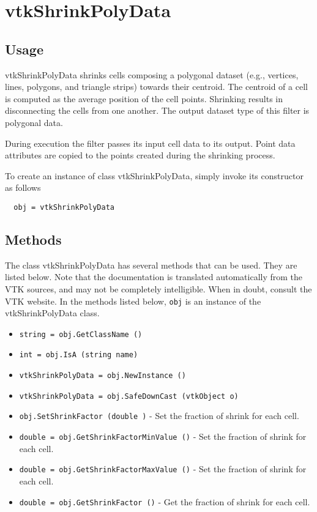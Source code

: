 \section{vtkShrinkPolyData}

\subsection{Usage}

 vtkShrinkPolyData shrinks cells composing a polygonal dataset (e.g., 
 vertices, lines, polygons, and triangle strips) towards their centroid. 
 The centroid of a cell is computed as the average position of the
 cell points. Shrinking results in disconnecting the cells from
 one another. The output dataset type of this filter is polygonal data.

 During execution the filter passes its input cell data to its
 output. Point data attributes are copied to the points created during the
 shrinking process.

To create an instance of class vtkShrinkPolyData, simply
invoke its constructor as follows
\begin{verbatim}
  obj = vtkShrinkPolyData
\end{verbatim}
\subsection{Methods}

The class vtkShrinkPolyData has several methods that can be used.
  They are listed below.
Note that the documentation is translated automatically from the VTK sources,
and may not be completely intelligible.  When in doubt, consult the VTK website.
In the methods listed below, \verb|obj| is an instance of the vtkShrinkPolyData class.
\begin{itemize}
\item  \verb|string = obj.GetClassName ()|

\item  \verb|int = obj.IsA (string name)|

\item  \verb|vtkShrinkPolyData = obj.NewInstance ()|

\item  \verb|vtkShrinkPolyData = obj.SafeDownCast (vtkObject o)|

\item  \verb|obj.SetShrinkFactor (double )| -  Set the fraction of shrink for each cell.

\item  \verb|double = obj.GetShrinkFactorMinValue ()| -  Set the fraction of shrink for each cell.

\item  \verb|double = obj.GetShrinkFactorMaxValue ()| -  Set the fraction of shrink for each cell.

\item  \verb|double = obj.GetShrinkFactor ()| -  Get the fraction of shrink for each cell.

\end{itemize}
